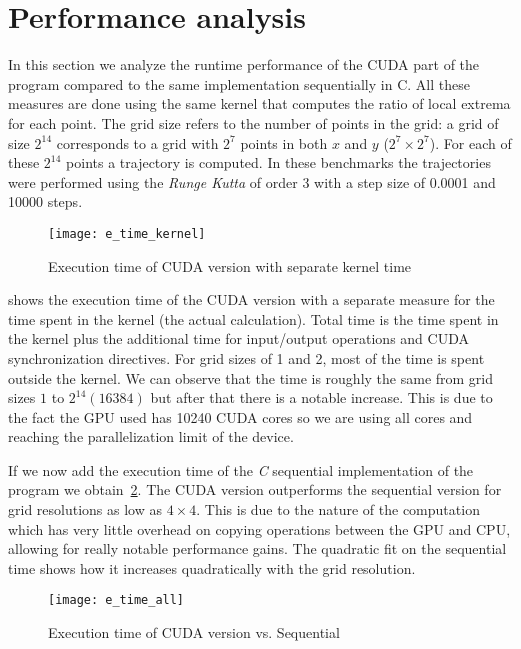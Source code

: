 
\section{Performance analysis}


In this section we analyze the runtime performance of the CUDA part of
the program compared to the same implementation sequentially in C. All
these measures are done using the same kernel that computes the ratio
of local extrema for each point. The grid size refers to the number of
points in the grid: a grid of size $2^14$ corresponds to a
grid with $2^7$ points in both $x$ and $y$ ($2^7 \times 2^7$). For each of these
$2^14$ points a trajectory is computed. In these benchmarks the trajectories were
performed using the \emph{Runge Kutta} of order 3 with a step size of 0.0001 and
10000 steps.


\begin{figure}[H]
    \centering
    \texttt{[image: e\_time\_kernel]}
    \caption{Execution time of CUDA version with separate kernel time
    }%
    \label{fig:time_overhead}
\end{figure}

 shows the execution time of the CUDA version with a
separate measure for the time spent in the kernel (the actual calculation). Total
time is the time spent in the kernel plus the additional time for input/output
operations and CUDA synchronization directives. For grid sizes of 1 and 2, most of the
time is spent outside the kernel. We can observe that the time is roughly the same
from grid sizes $1$ to $2^14 (16384)$ but after that there is a notable increase.
This is due to the fact the GPU used has 10240 CUDA cores so
we are using all cores and reaching the parallelization limit of the device.

If we now add the execution time of the \emph{C} sequential implementation of the
program we obtain~\cref{fig:time_cuda}. The CUDA version outperforms the sequential
version for grid resolutions as low as $4\times4$. This is due to the nature of the
computation which has very little overhead on copying operations between the GPU and
CPU, allowing for really notable performance gains. The quadratic fit on the sequential time
shows how it increases quadratically with the grid resolution.

\begin{figure}[H]
    \centering
    \texttt{[image: e\_time\_all]}
    \caption{Execution time of CUDA version vs. Sequential}%
    \label{fig:time_cuda}
\end{figure}

